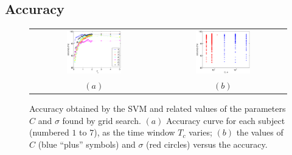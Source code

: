 \documentclass[a4paper,10pt,conference]{ieeeconf}
\begin{document}
\subsection{Accuracy}
\label{subsec:accuracy}

\begin{figure}[!t]
  \centering
    \begin{tabular}{cc}
      \includegraphics[width=0.45\textwidth]{accuracy.eps} &
      \includegraphics[width=0.45\textwidth]{hyperparams.eps} \\
      $(a)$ & $(b)$
    \end{tabular}
    \caption{Accuracy obtained by the SVM and related values of the
    parameters $C$ and $\sigma$ found by grid search. $(a)$ Accuracy
    curve for each subject (numbered $1$ to $7$), as the time window
    $T_c$ varies; $(b)$ the values of $C$ (blue ``plus'' symbols) and
    $\sigma$ (red circles) versus the accuracy.}
    \label{fig:accuracy}
\end{figure}
\end{document}
